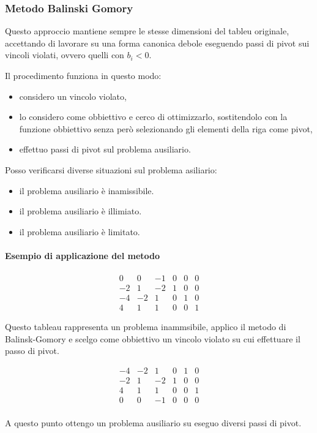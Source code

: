 \subsubsection{Metodo Balinski Gomory}
Questo approccio mantiene sempre le stesse dimensioni del tableu originale, accettando di lavorare su una forma canonica debole eseguendo passi di pivot sui vincoli violati, ovvero quelli con $b_i < 0$.

Il procedimento funziona in questo modo:
\begin{itemize}
	\item considero un vincolo violato,
	\item lo considero come obbiettivo e cerco di ottimizzarlo, sostitendolo con la funzione obbiettivo senza però selezionando gli elementi della riga come pivot,
	\item effettuo passi di pivot sul problema ausiliario.
\end{itemize}

Posso verificarsi diverse situazioni sul problema asiliario:

\begin{itemize}
	\item il problema ausiliario è inamissibile. 
	\item il problema ausiliario è illimiato.
	\item il problema ausiliario è limitato.
\end{itemize}

\paragraph{Esempio di applicazione del metodo}
\[  
	\begin{array}{r|rrrrr}
		 0 &  0 & -1 & 0 & 0 & 0 \\
		\hline
		-2 &  1 & -2 & 1 & 0 & 0 \\
		-4 & -2 &  1 & 0 & 1 & 0 \\
		 4 &  1 &  1 & 0 & 0 & 1 
	\end{array}
\]

Questo tableau rappresenta un problema inammsibile, applico il metodo di Balinsk-Gomory e scelgo come obbiettivo un vincolo violato su cui effettuare il passo di pivot.

\[  
	\begin{array}{r|rrrrr}
		-4 & -2 &  1 & 0 & 1 & 0 \\
		\hline
		-2 &  1 & -2 & 1 & 0 & 0 \\
		 4 &  1 &  1 & 0 & 0 & 1 \\
		\hline
		 0 &  0 & -1 & 0 & 0 & 0 \\
	\end{array}
\]

A questo punto ottengo un problema ausiliario su eseguo diversi passi di pivot. 

